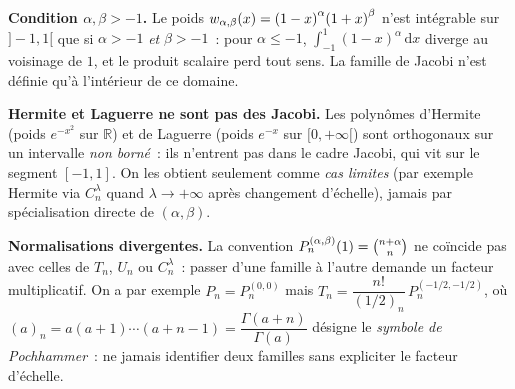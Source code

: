 \begin{mdframed}[style=cexbar]
  \textbf{Condition $\alpha,\beta>-1$.}\enspace
  Le poids $w_{\alpha,\beta}(x)={(1-x)}^\alpha{(1+x)}^\beta$ n'est intégrable sur
  $]-1,1[$ que si $\alpha>-1$ \emph{et} $\beta>-1$~: pour $\alpha\leq -1$,
  $\int_{-1}^1{(1-x)}^\alpha\,\mathrm{d}x$ diverge au voisinage de $1$, et le
  produit scalaire perd tout sens. La famille de Jacobi n'est définie qu'à
  l'intérieur de ce domaine.

  \smallskip\noindent
  \textbf{Hermite et Laguerre ne sont pas des Jacobi.}\enspace
  Les polynômes d'Hermite (poids $e^{-x^2}$ sur $\mathbb{R}$) et de Laguerre
  (poids $e^{-x}$ sur $[0,+\infty[$) sont orthogonaux sur un intervalle
  \emph{non borné}~: ils n'entrent pas dans le cadre Jacobi, qui vit sur le
  segment $[-1,1]$. On les obtient seulement comme \emph{cas limites}
  (par exemple Hermite via $C_n^{\lambda}$ quand $\lambda\to+\infty$ après
  changement d'échelle), jamais par spécialisation directe de $(\alpha,\beta)$.

  \smallskip\noindent
  \textbf{Normalisations divergentes.}\enspace
  La convention $P_n^{(\alpha,\beta)}(1)=\binom{n+\alpha}{n}$ ne coïncide pas avec celles de
  $T_n$, $U_n$ ou $C_n^{\lambda}$~: passer d'une famille à l'autre demande un
  facteur multiplicatif. On a par exemple $P_n=P_n^{(0,0)}$ mais
  $T_n=\dfrac{n!}{(1/2)_n}\,P_n^{(-1/2,-1/2)}$, où
  $(a)_n=a(a+1)\cdots(a+n-1)=\dfrac{\Gamma(a+n)}{\Gamma(a)}$ désigne le
  \emph{symbole de Pochhammer}~: ne jamais
  identifier deux familles sans expliciter le facteur d'échelle.
\end{mdframed}

\vspace{6pt}
\exolabel

